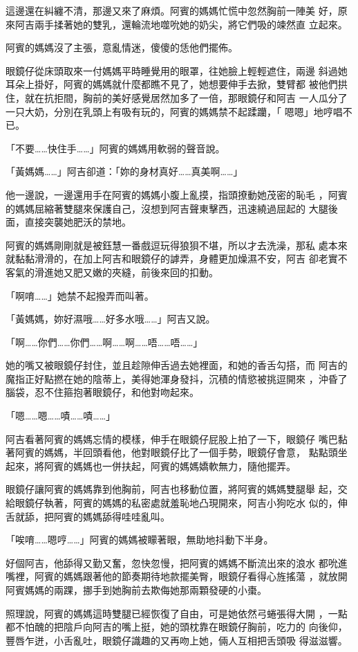 這邊還在糾纏不清，那邊又來了麻煩。阿賓的媽媽忙慌中忽然胸前一陣美
好，原來阿吉兩手揉著她的雙乳，還輪流地噬吮她的奶尖，將它們吸的竦然直
立起來。

阿賓的媽媽沒了主張，意亂情迷，傻傻的恁他們擺佈。

眼鏡仔從床頭取來一付媽媽平時睡覺用的眼罩，往她臉上輕輕遮住，兩邊
斜過她耳朵上掛好，阿賓的媽媽就什麼都瞧不見了，她想要伸手去掀，雙臂都
被他們拱住，就在抗拒間，胸前的美好感覺居然加多了一倍，那眼鏡仔和阿吉
一人瓜分了一只大奶，分別在乳頭上有吸有玩的，阿賓的媽媽禁不起蹂躪，「
嗯嗯」地哼唱不已。

「不要……快住手……」阿賓的媽媽用軟弱的聲音說。

「黃媽媽……」阿吉卻道：「妳的身材真好……真美啊……」

他一邊說，一邊還用手在阿賓的媽媽小腹上亂摸，指頭撩動她茂密的恥毛
，阿賓的媽媽屈縮著雙腿來保護自己，沒想到阿吉聲東擊西，迅速繞過屈起的
大腿後面，直接突襲她肥沃的禁地。

阿賓的媽媽剛剛就是被鈺慧一番戲逗玩得狼狽不堪，所以才去洗澡，那私
處本來就黏黏滑滑的，在加上阿吉和眼鏡仔的謼弄，身體更加燥濕不安，阿吉
卻老實不客氣的滑進她又肥又嫩的夾縫，前後來回的扣動。

「啊唷……」她禁不起撥弄而叫著。

「黃媽媽，妳好濕哦……好多水哦……」阿吉又說。

「啊……你們……你們……啊……啊……唔……唔……」

她的嘴又被眼鏡仔封住，並且趁隙伸舌過去她裡面，和她的香舌勾搭，而
阿吉的魔指正好點撚在她的陰蒂上，美得她渾身發抖，沉積的情慾被挑逗開來
，沖昏了腦袋，忍不住箍抱著眼鏡仔，和他對吻起來。

「嗯……嗯……嘖……嘖……」

阿吉看著阿賓的媽媽忘情的模樣，伸手在眼鏡仔屁股上拍了一下，眼鏡仔
嘴巴黏著阿賓的媽媽，半回頭看他，他對眼鏡仔比了一個手勢，眼鏡仔會意，
點點頭坐起來，將阿賓的媽媽也一併扶起，阿賓的媽媽嬌軟無力，隨他擺弄。

眼鏡仔讓阿賓的媽媽靠到他胸前，阿吉也移動位置，將阿賓的媽媽雙腿舉
起，交給眼鏡仔執著，阿賓的媽媽的私密處就羞恥地凸現開來，阿吉小狗吃水
似的，伸舌就舔，把阿賓的媽媽舔得哇哇亂叫。

「唉唷……嗯哼……」阿賓的媽媽被矇著眼，無助地抖動下半身。

好個阿吉，他舔得又勤又奮，忽快忽慢，把阿賓的媽媽不斷流出來的浪水
都吮進嘴裡，阿賓的媽媽跟著他的節奏期待地款擺美臀，眼鏡仔看得心旌搖蕩
，就放開阿賓媽媽的兩踝，挪手到她胸前去欺侮她那兩顆發硬的小棗。

照理說，阿賓的媽媽這時雙腿已經恢復了自由，可是她依然弓蜷張得大開
，一點都不怕醜的把陰戶向阿吉的嘴上挺，她的頭枕靠在眼鏡仔胸前，吃力的
向後仰，豐唇乍迸，小舌亂吐，眼鏡仔識趣的又再吻上她，倆人互相把舌頭吸
得滋滋響。

